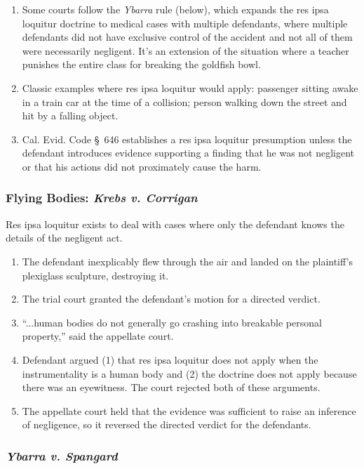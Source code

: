 \begin{enumerate}
{    4.}
    \item Some courts follow the \emph{Ybarra} rule (below), which expands the 
    res ipsa loquitur doctrine to medical cases with multiple defendants, 
    where multiple defendants did not have exclusive control of the accident 
    and not all of them were necessarily negligent. It's an extension of the 
    situation where a teacher punishes the entire class for breaking the 
    goldfish bowl.
    \item Classic examples where res ipsa loquitur would apply: passenger 
    sitting awake in a train car at the time of a collision; person walking 
    down the street and hit by a falling object.
    \item Cal. Evid. Code \S\ 646 establishes a res ipsa loquitur presumption 
    unless the defendant introduces evidence supporting a finding that he was 
    not negligent or that his actions did not proximately cause the harm.
\end{enumerate}

\subsubsection{Flying Bodies: \emph{Krebs v. Corrigan}}

Res ipsa loquitur exists to deal with cases where only the defendant knows the 
details of the negligent act.

\begin{enumerate}
    \item The defendant inexplicably flew through the air and landed on the 
    plaintiff's plexiglass sculpture, destroying it.
    \item The trial court granted the defendant's motion for a directed verdict.
    \item ``...human bodies do not generally go crashing into breakable 
    personal property,'' said the appellate court.
    \item Defendant argued (1) that res ipsa loquitur does not apply when the 
    instrumentality is a human body and (2) the doctrine does not apply 
    because there was an eyewitness. The court rejected both of these 
    arguments.
    \item The appellate court held that the evidence was sufficient to raise 
    an inference of negligence, so it reversed the directed verdict for the 
    defendants.
\end{enumerate}

\subsubsection{\emph{Ybarra v. Spangard}}

